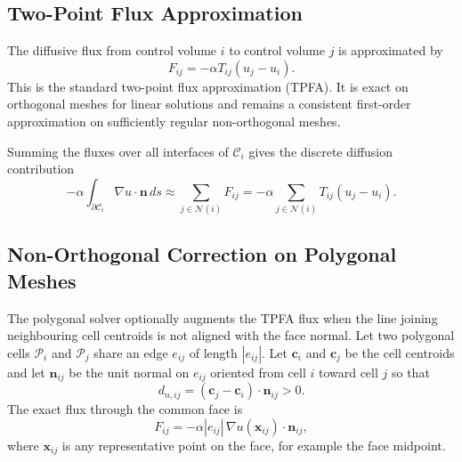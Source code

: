 \documentclass[11pt]{article}
\theoremstyle{plain}
\theoremstyle{definition}
\theoremstyle{remark}
\numberwithin{equation}{section}
\begin{document}
\subsection{Two-Point Flux Approximation}
The diffusive flux from control volume $i$ to control volume $j$ is approximated by
\begin{equation}
\label{eq:tpfa_flux}
F_{ij} = - \alpha T_{ij}(u_j - u_i).
\end{equation}
This is the standard two-point flux approximation (TPFA). It is exact on orthogonal meshes for linear solutions and remains a consistent first-order approximation on sufficiently regular non-orthogonal meshes.

Summing the fluxes over all interfaces of $\mathcal{C}_i$ gives the discrete diffusion contribution
\begin{equation}
\label{eq:discrete_flux_sum}
-\alpha \int_{\partial \mathcal{C}_i} \nabla u \cdot \bm{n} \, ds
\approx \sum_{j \in \mathcal{N}(i)} F_{ij}
= -\alpha \sum_{j \in \mathcal{N}(i)} T_{ij}(u_j - u_i).
\end{equation}

\subsection{Non-Orthogonal Correction on Polygonal Meshes}
The polygonal solver optionally augments the TPFA flux when the line joining neighbouring cell centroids is not aligned with the face normal. Let two polygonal cells $\mathcal{P}_i$ and $\mathcal{P}_j$ share an edge $e_{ij}$ of length $|e_{ij}|$. Let $\bm{c}_i$ and $\bm{c}_j$ be the cell centroids and let $\bm{n}_{ij}$ be the unit normal on $e_{ij}$ oriented from cell $i$ toward cell $j$ so that
\begin{equation}
\label{eq:dn_def}
d_{n,ij} = (\bm{c}_j - \bm{c}_i) \cdot \bm{n}_{ij} > 0.
\end{equation}
The exact flux through the common face is
\begin{equation}
\label{eq:exact_face_flux}
F_{ij} = - \alpha |e_{ij}| \, \nabla u(\bm{x}_{ij}) \cdot \bm{n}_{ij},
\end{equation}
where $\bm{x}_{ij}$ is any representative point on the face, for example the face midpoint.
\end{document}

